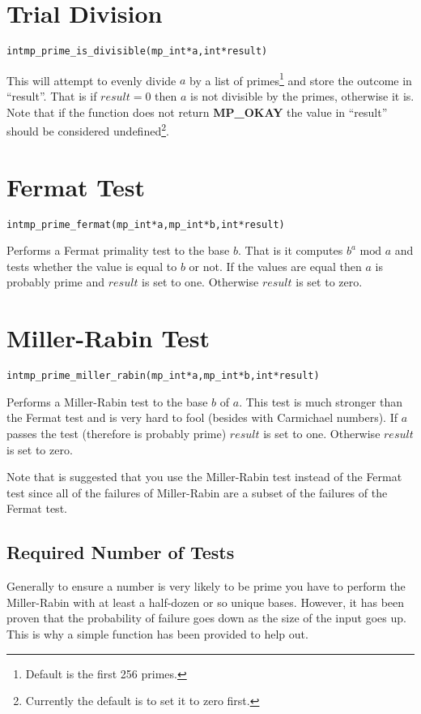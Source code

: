 \documentclass[synpaper]{book}
\begin{document}
\section{Trial Division}
\begin{alltt}
int mp_prime_is_divisible (mp_int * a, int *result)
\end{alltt}
This will attempt to evenly divide $a$ by a list of primes\footnote{Default is the first 256 primes.} and store the
outcome in ``result''.  That is if $result = 0$ then $a$ is not divisible by the primes, otherwise it is.  Note that
if the function does not return \textbf{MP\_OKAY} the value in ``result'' should be considered undefined\footnote{Currently
the default is to set it to zero first.}.

\section{Fermat Test}
\begin{alltt}
int mp_prime_fermat (mp_int * a, mp_int * b, int *result)
\end{alltt}
Performs a Fermat primality test to the base $b$.  That is it computes $b^a \mbox{ mod }a$ and tests whether the value is
equal to $b$ or not.  If the values are equal then $a$ is probably prime and $result$ is set to one.  Otherwise $result$
is set to zero.

\section{Miller-Rabin Test}
\begin{alltt}
int mp_prime_miller_rabin (mp_int * a, mp_int * b, int *result)
\end{alltt}
Performs a Miller-Rabin test to the base $b$ of $a$.  This test is much stronger than the Fermat test and is very hard to
fool (besides with Carmichael numbers).  If $a$ passes the test (therefore is probably prime) $result$ is set to one.
Otherwise $result$ is set to zero.

Note that is suggested that you use the Miller-Rabin test instead of the Fermat test since all of the failures of
Miller-Rabin are a subset of the failures of the Fermat test.

\subsection{Required Number of Tests}
Generally to ensure a number is very likely to be prime you have to perform the Miller-Rabin with at least a half-dozen
or so unique bases.  However, it has been proven that the probability of failure goes down as the size of the input goes up.
This is why a simple function has been provided to help out.
\end{document}
